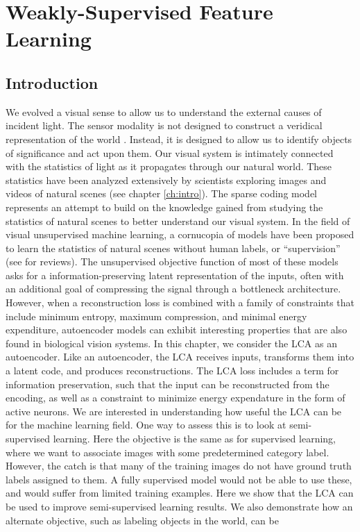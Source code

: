 

\section{Weakly-Supervised Feature Learning}\label{sec:ch3_weak_supervised_learning}
\subsection{Introduction}
We evolved a visual sense to allow us to understand the external causes of incident light. The sensor modality is not designed to construct a veridical representation of the world \parencite{gollisch2010eye}. Instead, it is designed to allow us to identify objects of significance and act upon them. Our visual system is intimately connected with the statistics of light as it propagates through our natural world. These statistics have been analyzed extensively by scientists exploring images and videos of natural scenes (see chapter \ref{ch:intro}). The sparse coding model represents an attempt to build on the knowledge gained from studying the statistics of natural scenes to better understand our visual system. In the field of visual unsupervised machine learning, a cornucopia of models have been proposed to learn the statistics of natural scenes without human labels, or ``supervision'' (see \parencite{baldi2012autoencoders, bengio2012unsupervised, goodfellow2016deep} for reviews). The unsupervised objective function of most of these models asks for a information-preserving latent representation of the inputs, often with an additional goal of compressing the signal through a bottleneck architecture. However, when a reconstruction loss is combined with a family of constraints that include minimum entropy, maximum compression, and minimal energy expenditure, autoencoder models can exhibit interesting properties that are also found in biological vision systems. In this chapter, we consider the LCA as an autoencoder. Like an autoencoder, the LCA receives inputs, transforms them into a latent code, and produces reconstructions. The LCA loss includes a term for information preservation, such that the input can be reconstructed from the encoding, as well as a constraint to minimize energy expendature in the form of active neurons. We are interested in understanding how useful the LCA can be for the machine learning field. One way to assess this is to look at semi-supervised learning. Here the objective is the same as for supervised learning, where we want to associate images with some predetermined category label. However, the catch is that many of the training images do not have ground truth labels assigned to them. A fully supervised model would not be able to use these, and would suffer from limited training examples. Here we show that the LCA can be used to improve semi-supervised learning results. We also demonstrate how an alternate objective, such as labeling objects in the world, can be 